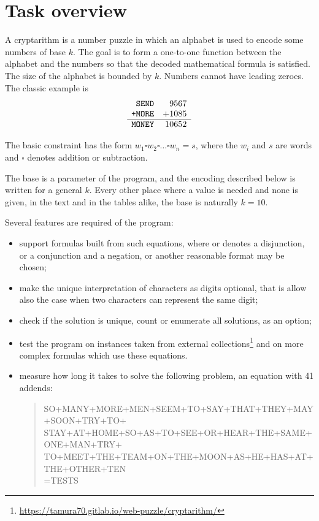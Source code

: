 \documentclass[11pt,a4paper]{article}
\begin{document}
\makereporttitle

\section{Task overview}

A cryptarithm is a number puzzle in which an alphabet is used to encode some
numbers of base $k$. The goal is to form a one-to-one function between the
alphabet and the numbers so that the decoded mathematical formula is
satisfied. The size of the alphabet is bounded by $k$. Numbers cannot have leading zeroes. The classic example is
\[
\begin{array}{r@{\quad}r}
  \texttt{ SEND} & 9567 \\
  \texttt{+MORE} & +1085 \\
  \hline
  \texttt{MONEY} & 10652
\end{array}
\]

The basic constraint has the form $w_1 \square w_2 \square \dots \square w_n = s$,
where the $w_i$ and $s$ are words and $\square$ denotes addition or
subtraction.

The base is a parameter of the program, and the encoding described below is
written for a general $k$. Every other place where a value is needed and none is given, in
the text and in the tables alike, the base is naturally $k = 10$.

Several features are required of the program:

\begin{itemize}
  \item support formulas built from such equations, where \code{||} or
   denotes a disjunction, \code{\&\&} or  a conjunction and
   a negation, or another reasonable format may be chosen;
  \item make the unique interpretation of characters as digits optional, that
  is allow also the case when two characters can represent the same digit;
  \item check if the solution is unique, count or enumerate all solutions, as
  an option;
  \item test the program on instances taken from external
  collections\footnote{\url{https://tamura70.gitlab.io/web-puzzle/cryptarithm/}}
  and on more complex formulas which use these equations.
  \item measure how long it takes to solve
  the following problem, an equation with 41 addends:
  \begin{quote}\small\ttfamily
  SO+MANY+MORE+MEN+SEEM+TO+SAY+THAT+THEY+MAY+SOON+TRY+TO+\\
  STAY+AT+HOME+SO+AS+TO+SEE+OR+HEAR+THE+SAME+ONE+MAN+TRY+\\
  TO+MEET+THE+TEAM+ON+THE+MOON+AS+HE+HAS+AT+THE+OTHER+TEN\\
  =TESTS
  \end{quote}
\end{itemize}
\end{document}
